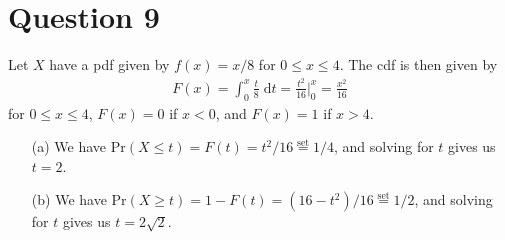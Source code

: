 \documentclass[10pt]{article}
\begin{document}
\section{Question 9} \noindent
Let \(X\) have a pdf given by \(f(x) = x/8\) for \(0 \le x \le 4\).
The cdf is then given by
\begin{align*}
    F(x) = \int_0^x \frac{t}{8} \;\mathrm{d}t
    = \frac{t^2}{16} \bigg|_0^x
    = \frac{x^2}{16}
\end{align*}
for \(0 \le x \le 4\), \(F(x) = 0\) if \(x < 0\), and \(F(x) = 1\) if \(x > 4\). 
\begin{itemize}
    \item[(a)] We have \(\mathrm{Pr}(X \le t) = F(t) = t^2 / 16 \overset{\text{set}}{=} 1/4\), and solving for \(t\) gives us \(t = 2\). 
    \item[(b)] We have \(\mathrm{Pr}(X \ge t) = 1 - F(t) = (16 - t^2)/16 \overset{\text{set}}{=} 1/2\), and solving for \(t\) gives us \(t = 2\sqrt{2}\).
\end{itemize}

\end{document}
